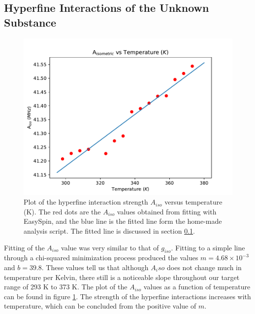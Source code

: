 \documentclass[twocolumn]{article}
\begin{document}
\subsection{Hyperfine Interactions of the Unknown Substance}
\label{sec:ResultsAfact}
\begin{figure}[H]
	\includegraphics[scale=0.49]{A_iso_Plot}
	\caption{Plot of the hyperfine interaction strength $A_{iso}$ versus temperature (\si{K}). The red dots are the $A_{iso}$ values obtained from fitting with EasySpin, and the blue line is the fitted line form the home-made analysis script. The fitted line is discussed in section \ref{sec:ResultsAfact}.\label{fig:fig3}}
\end{figure}
Fitting of the $A_{iso}$ value was very similar to that of $g_{iso}$. Fitting to a simple line through a chi-squared minimization process produced the values $m=4.68\times 10^{-3}$ and $b=39.8$. These values tell us that although $A_iso$ does not change much in temperature per Kelvin, there still is a noticeable slope throughout our target range of 293 \si{K} to 373 \si{K}. The plot of the $A_{iso}$ values as a function of temperature can be found in figure \ref{fig:fig3}. The strength of the hyperfine interactions increases with temperature, which can be concluded from the positive value of $m$. 
\end{document}
